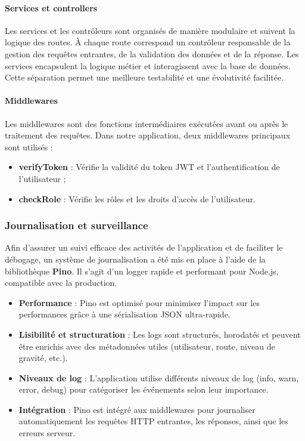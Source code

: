 \paragraph{Services et controllers}  
Les services et les contrôleurs sont organisés de manière modulaire et suivent la logique des routes. À chaque route correspond un contrôleur responsable de la gestion des requêtes entrantes, de la validation des données et de la réponse. Les services encapsulent la logique métier et interagissent avec la base de données. Cette séparation permet une meilleure testabilité et une évolutivité facilitée.

\paragraph{Middlewares}

Les middlewares sont des fonctions intermédiaires exécutées avant ou après le traitement des requêtes. Dans notre application, deux middlewares principaux sont utilisés :

\begin{itemize}
  \item \textbf{verifyToken} : Vérifie la validité du token JWT et l’authentification de l’utilisateur ;
  \item \textbf{checkRole} : Vérifie les rôles et les droits d’accès de l’utilisateur.
\end{itemize}

\subsubsection{Journalisation et surveillance}

Afin d'assurer un suivi efficace des activités de l'application et de faciliter le débogage, un système de journalisation a été mis en place à l'aide de la bibliothèque \textbf{Pino}. Il s'agit d'un logger rapide et performant pour Node.js, compatible avec la production.

\begin{itemize}
  \item \textbf{Performance} : Pino est optimisé pour minimiser l'impact sur les performances grâce à une sérialisation JSON ultra-rapide.
  \item \textbf{Lisibilité et structuration} : Les logs sont structurés, horodatés et peuvent être enrichis avec des métadonnées utiles (utilisateur, route, niveau de gravité, etc.).
  \item \textbf{Niveaux de log} : L’application utilise différents niveaux de log (info, warn, error, debug) pour catégoriser les événements selon leur importance.
  \item \textbf{Intégration} : Pino est intégré aux middlewares pour journaliser automatiquement les requêtes HTTP entrantes, les réponses, ainsi que les erreurs serveur.
\end{itemize}

